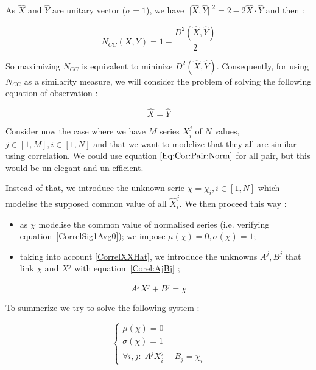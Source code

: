 As $\widehat {X}$ and $\widehat {Y}$ are unitary vector ($\sigma = 1$), we have
$||\widehat {X} ,\widehat {Y}||^2  = 2 - 2 \widehat {X} \cdot \widehat {Y} $ and then :


\begin{equation}
    N_{CC}(X,Y) = 1-\frac{ D^2(\widehat {X} ,\widehat {Y})}{2}
\end{equation}

So maximizing $N_{CC}$ is equivalent to mininize $ D^2(\widehat {X} ,\widehat {Y})$. Consequently,
for using  $N_{CC}$ as a similarity measure, we will consider the problem of  solving the following equation of observation :

\begin{equation}
    \widehat {X} =\widehat {Y} \label{Eq:Cor:Pair:Norm}
\end{equation}

Consider now the case where we have $M$ series $X^j_i$ of $N$ values, $j \in [1,M], i \in [1,N]$
and that we want to modelize that they all are similar using correlation. We could use
equation $\ref{Eq:Cor:Pair:Norm}$ for all pair, but this would be un-elegant and un-efficient.

Instead of that, we introduce the unknown serie $\chi = \chi_i, i \in [1,N]$ which modelise the supposed common value
of all $\widehat X^j_i$. We then proceed this way :

\begin{itemize}
    \item as $\chi$ modelise the common value of normalised series (i.e. verifying equation~\ref{CorrelSig1Avg0});
          we impose $\mu(\chi)=0, \sigma(\chi)=1$;
    \item taking into account \ref{CorrelXXHat},  we introduce the unknowns $A^j,B^j$
          that link $\chi$ and $X^j$ with equation~\ref{Corel:AjBj} ;
\end{itemize}

\begin{equation}
	A^j X^j + B^j = \chi \label{Corel:AjBj}
\end{equation}

To summerize we try to solve the following system :

\begin{equation}
\left\{ \begin{array}{rc|l}
     \mu(\chi) = 0         \\ 
     \sigma(\chi) = 1         \\ 
     \forall i,j : \;  A^j X^j_i + B_j = \chi _i
\end{array}\right.
\label{XXXXX}
\end{equation}


